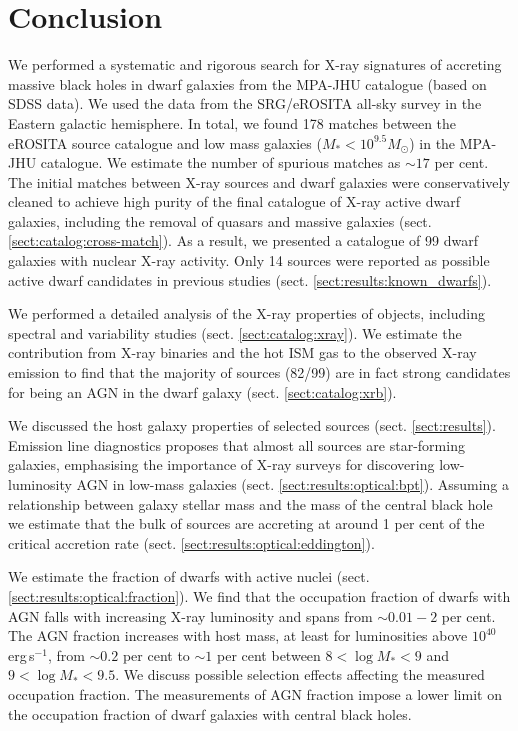 \documentclass[fleqn,usenatbib]{mnras}
\newcommand{\ergps}{erg\,s$^{-1}$}
\newcommand{\msun}{M_\odot}
\begin{document}
\section{Conclusion}
\label{sect:conclusion}

We performed a systematic and rigorous search for X-ray signatures of accreting massive black holes in dwarf galaxies from the MPA-JHU catalogue (based on SDSS data). We used the data from the SRG/eROSITA all-sky survey in the Eastern galactic hemisphere.  In total, we found 178 matches between the eROSITA source catalogue and low mass galaxies ($M_*<10^{9.5}\msun$) in the MPA-JHU  catalogue. We estimate the number of spurious matches as $\sim17$ per cent. The initial matches between X-ray sources and dwarf galaxies were conservatively cleaned to achieve high purity of the final catalogue of X-ray active dwarf galaxies, including the removal of quasars and massive galaxies (sect. \ref{sect:catalog:cross-match}).  As a result, we presented a catalogue of 99 dwarf galaxies with nuclear X-ray activity. Only 14 sources were reported as possible active dwarf candidates in previous studies (sect. \ref{sect:results:known_dwarfs}). 

We performed a detailed analysis of  the X-ray properties of objects, including spectral and variability studies (sect. \ref{sect:catalog:xray}). We estimate the contribution from X-ray binaries and the hot ISM gas to the observed X-ray emission to find that the majority of sources (82/99)  are in fact strong candidates for being an AGN in the dwarf galaxy (sect. \ref{sect:catalog:xrb}).

We discussed the host galaxy properties of selected sources (sect. \ref{sect:results}). Emission line diagnostics proposes that almost all sources are star-forming galaxies, emphasising the importance of X-ray surveys for discovering low-luminosity AGN in low-mass galaxies (sect. \ref{sect:results:optical:bpt}). Assuming a relationship between galaxy stellar mass and the mass of the central black hole we estimate that the bulk of sources are accreting at around 1 per cent of the critical accretion rate (sect. \ref{sect:results:optical:eddington}).

We estimate the fraction of dwarfs with active nuclei (sect. \ref{sect:results:optical:fraction}).  We find that the occupation fraction of dwarfs with AGN falls with increasing X-ray luminosity and spans from $\sim0.01-2$ per cent. The AGN fraction increases with host mass, at least for luminosities above $10^{40}$ \ergps, from $\sim0.2$ per cent to $\sim1$ per cent between $8<\log{M_*}<9$ and $9<\log{M_*}<9.5$. We discuss possible selection effects affecting the measured occupation fraction. The measurements of AGN fraction impose a lower limit on the occupation fraction of dwarf galaxies with central black holes. 
\end{document}
